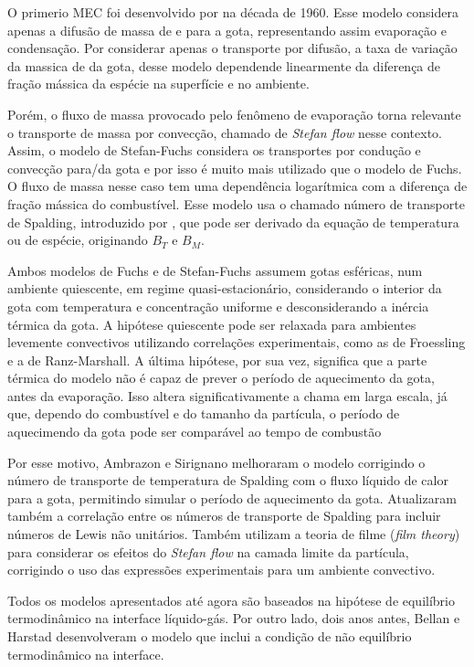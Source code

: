 
O primerio MEC foi desenvolvido por \cite{Fuks1959} na década de 1960. 
Esse modelo considera apenas a difusão de massa de e para a gota, representando assim evaporação e condensação.
Por considerar apenas o transporte por difusão, a taxa de variação da  massica de da gota, desse modelo dependende linearmente da diferença de fração mássica da espécie na superfície e no ambiente.

Porém, o fluxo de massa provocado pelo fenômeno de evaporação torna relevante o transporte de massa por convecção, chamado de \emph{Stefan flow} nesse contexto. 
Assim, o modelo de Stefan-Fuchs considera os transportes por condução e convecção para/da gota e por isso é muito mais utilizado que o modelo de Fuchs.
O fluxo de massa nesse caso tem uma dependência logarítmica com a diferença de fração mássica do combustível. 
Esse modelo usa o chamado número de transporte de Spalding, introduzido por , que pode ser derivado da equação de temperatura ou de espécie, originando $B_T$ e $B_M$.

Ambos modelos de Fuchs e de Stefan-Fuchs assumem gotas esféricas, num ambiente quiescente, em regime quasi-estacionário, considerando o interior da gota com temperatura e concentração uniforme e desconsiderando a inércia térmica da gota.
A hipótese quiescente pode ser relaxada para ambientes levemente convectivos utilizando correlações experimentais, como as de Froessling e a de Ranz-Marshall. 
A última hipótese, por sua vez, significa que a parte térmica do modelo não é capaz de prever o período de aquecimento da gota, antes da evaporação.
Isso altera significativamente a chama em larga escala, já que, dependo do combustível e do tamanho da partícula, o período de aquecimendo da gota pode ser comparável ao tempo de combustão  

Por esse motivo, Ambrazon e Sirignano  melhoraram o modelo corrigindo o número de transporte de temperatura de Spalding com o fluxo líquido de calor para a gota, permitindo simular o período de aquecimento da gota.
Atualizaram também a correlação entre os números de transporte de Spalding para incluir números de Lewis não unitários.
Também utilizam a teoria de filme (\emph{film theory}) para considerar os efeitos do \emph{Stefan flow} na camada limite da partícula, corrigindo o uso das expressões experimentais para um ambiente convectivo. 

Todos os modelos apresentados até agora são baseados na hipótese de equilíbrio termodinâmico na interface líquido-gás.
Por outro lado, dois anos antes, Bellan e Harstad  desenvolveram o modelo que inclui a condição de não equilíbrio termodinâmico na interface.

